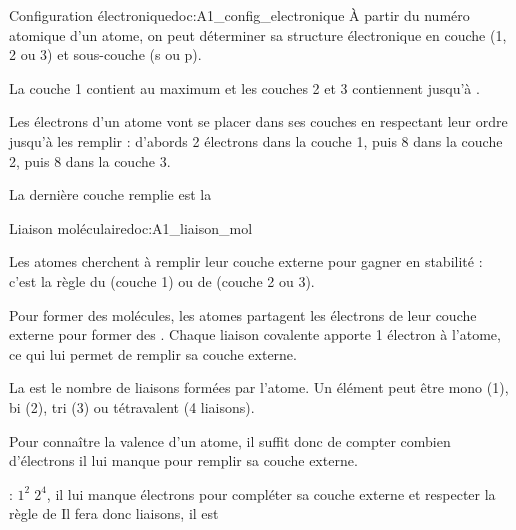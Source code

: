 \begin{doc}{Configuration électronique}{doc:A1_config_electronique}
  À partir du numéro atomique d'un atome, on peut déterminer sa structure électronique en couche (1, 2 ou 3) et sous-couche (s ou p).
  
  \begin{importants}
    La couche 1 contient au maximum  et les couches 2 et 3 contiennent jusqu'à .
  \end{importants}
  Les électrons d'un atome vont se placer dans ses couches en respectant leur ordre jusqu'à les remplir : d'abords 2 électrons dans la couche 1, puis 8 dans la couche 2, puis 8 dans la couche 3. 
  \begin{importants}
    La dernière couche remplie est la 
  \end{importants}
\end{doc}



\begin{doc}{Liaison moléculaire}{doc:A1_liaison_mol}
  \begin{importants}
    Les atomes cherchent à remplir leur couche externe pour gagner en stabilité : c'est la règle du  (couche 1) ou de  (couche 2 ou 3).
  \end{importants}
  
  \begin{importants}
    Pour former des molécules, les atomes partagent les électrons de leur couche externe pour former des .
    Chaque liaison covalente apporte 1 électron à l'atome, ce qui lui permet de remplir sa couche externe.
  \end{importants}
  \begin{importants}
    La  est le nombre de liaisons formées par l'atome.
    Un élément peut être mono (1), bi (2), tri (3) ou tétravalent (4 liaisons).
  \end{importants}
  Pour connaître la valence d'un atome, il suffit donc de compter combien d'électrons il lui manque pour remplir sa couche externe.

  \exemple {} : $1^2\; 2^4$,
  il lui manque  électrons pour compléter sa couche externe et respecter la règle de 
  Il fera donc  liaisons, il est 
\end{doc}

